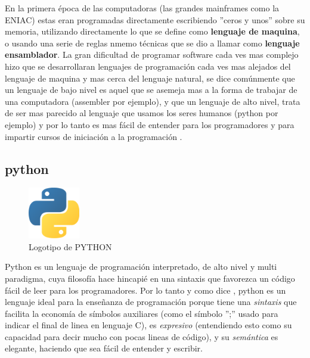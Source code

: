 En la primera época de las computadoras (las grandes mainframes como la ENIAC) estas eran programadas directamente escribiendo ''ceros y unos'' sobre su memoria, utilizando directamente lo que se define como \textbf{lenguaje de maquina}, o usando una serie de reglas nmemo técnicas que se dio a llamar como \textbf{lenguaje ensamblador}. La gran dificultad de programar software cada ves mas complejo hizo que se desarrollaran lenguajes de programación cada ves mas alejados del lenguaje de maquina y mas cerca del lenguaje natural, se dice comúnmente que un lenguaje de bajo nivel es aquel que se asemeja mas a la forma de trabajar de una computadora (assembler por ejemplo), y que un lenguaje de alto nivel, trata de ser mas parecido al lenguaje que usamos los seres humanos (python por ejemplo) y por lo tanto es mas fácil de entender para los programadores y para impartir cursos de iniciación a la programación \citep{de2016introduccion}.

\subsection{python}


\begin{figure}
  \begin{center}
    \includegraphics[width=0.2\textwidth]{figuras/Python-logo.png}
    \caption[Caption for LOF]{Logotipo de PYTHON}
    
    \label{fig:python_logo}
  \end{center}
\end{figure}

Python es un lenguaje de programación interpretado, de alto nivel y multi paradigma, cuya filosofía hace hincapié en una sintaxis que favorezca un código fácil de leer para los programadores. Por lo tanto y como dice \cite{marzal2003aprender}, python es un lenguaje ideal para la enseñanza de programación porque tiene una \textit{sintaxis} que facilita la economía de símbolos auxiliares (como el símbolo '';'' usado para indicar el final de linea en lenguaje C), es \textit{expresivo} (entendiendo esto como su capacidad para decir mucho con pocas lineas de código), y su \textit{semántica} es elegante, haciendo que sea fácil de entender y escribir.

